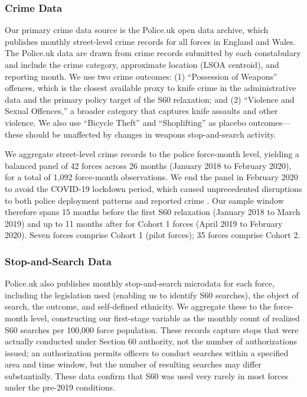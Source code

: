 \documentclass[12pt]{article}
\begin{document}
\subsubsection*{Crime Data}

Our primary crime data source is the Police.uk open data archive, which publishes monthly street-level crime records for all forces in England and Wales. The Police.uk data are drawn from crime records submitted by each constabulary and include the crime category, approximate location (LSOA centroid), and reporting month. We use two crime outcomes: (1) ``Possession of Weapons'' offences, which is the closest available proxy to knife crime in the administrative data and the primary policy target of the S60 relaxation; and (2) ``Violence and Sexual Offences,'' a broader category that captures knife assaults and other violence. We also use ``Bicycle Theft'' and ``Shoplifting'' as placebo outcomes---these should be unaffected by changes in weapons stop-and-search activity.

We aggregate street-level crime records to the police force-month level, yielding a balanced panel of 42 forces across 26 months (January 2018 to February 2020), for a total of 1,092 force-month observations. We end the panel in February 2020 to avoid the COVID-19 lockdown period, which caused unprecedented disruptions to both police deployment patterns and reported crime \citep{buil-gil2021covid}. Our sample window therefore spans 15 months before the first S60 relaxation (January 2018 to March 2019) and up to 11 months after for Cohort 1 forces (April 2019 to February 2020). Seven forces comprise Cohort 1 (pilot forces); 35 forces comprise Cohort 2.

\subsubsection*{Stop-and-Search Data}

Police.uk also publishes monthly stop-and-search microdata for each force, including the legislation used (enabling us to identify S60 searches), the object of search, the outcome, and self-defined ethnicity. We aggregate these to the force-month level, constructing our first-stage variable as the monthly count of realized S60 searches per 100,000 force population. These records capture stops that were actually conducted under Section 60 authority, not the number of authorizations issued; an authorization permits officers to conduct searches within a specified area and time window, but the number of resulting searches may differ substantially. These data confirm that S60 was used very rarely in most forces under the pre-2019 conditions.
\end{document}
